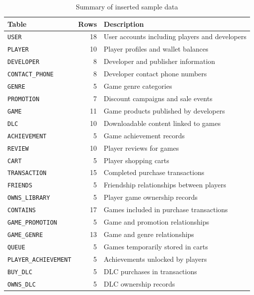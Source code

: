 \begin{table}[H]
\centering
\caption{Summary of inserted sample data}
\label{tab:sample-data-summary}
\begin{tabular}{|l|r|p{7cm}|}
\hline
\textbf{Table} & \textbf{Rows} & \textbf{Description} \\ \hline
\texttt{USER} & 18 & User accounts including players and developers \\ \hline
\texttt{PLAYER} & 10 & Player profiles and wallet balances \\ \hline
\texttt{DEVELOPER} & 8 & Developer and publisher information \\ \hline
\texttt{CONTACT\_PHONE} & 8 & Developer contact phone numbers \\ \hline
\texttt{GENRE} & 5 & Game genre categories \\ \hline
\texttt{PROMOTION} & 7 & Discount campaigns and sale events \\ \hline
\texttt{GAME} & 11 & Game products published by developers \\ \hline
\texttt{DLC} & 10 & Downloadable content linked to games \\ \hline
\texttt{ACHIEVEMENT} & 5 & Game achievement records \\ \hline
\texttt{REVIEW} & 10 & Player reviews for games \\ \hline
\texttt{CART} & 5 & Player shopping carts \\ \hline
\texttt{TRANSACTION} & 15 & Completed purchase transactions \\ \hline
\texttt{FRIENDS} & 5 & Friendship relationships between players \\ \hline
\texttt{OWNS\_LIBRARY} & 5 & Player game ownership records \\ \hline
\texttt{CONTAINS} & 17 & Games included in purchase transactions \\ \hline
\texttt{GAME\_PROMOTION} & 5 & Game and promotion relationships \\ \hline
\texttt{GAME\_GENRE} & 13 & Game and genre relationships \\ \hline
\texttt{QUEUE} & 5 & Games temporarily stored in carts \\ \hline
\texttt{PLAYER\_ACHIEVEMENT} & 5 & Achievements unlocked by players \\ \hline
\texttt{BUY\_DLC} & 5 & DLC purchases in transactions \\ \hline
\texttt{OWNS\_DLC} & 5 & DLC ownership records \\ \hline
\end{tabular}
\end{table}
